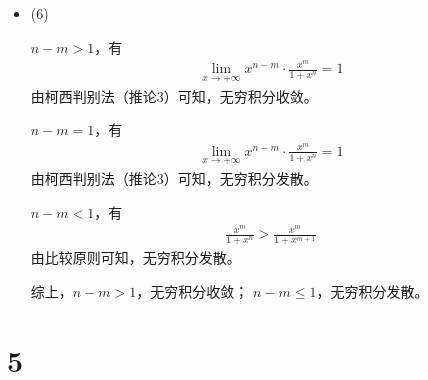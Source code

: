 \documentclass{article}
\begin{document}
\begin{itemize}
        $n > 1$，取$p = \frac{1 + p}{2} > 1$，于是$n - p > 1$
        \begin{align*}
          \lim\limits_{x \to +\infty} x^{p} \cdot \frac{\ln (1 + x)}{x^n}
           & = \lim\limits_{x \to +\infty} \frac{\ln (1 + x)}{x^{n - p}} \\
           & = 0
        \end{align*}
        所以无穷积分收敛。

        $n = 1$，有
        \begin{align*}
          \lim\limits_{x \to +\infty} x \cdot \frac{\ln (1 + x)}{x}
           & = \lim\limits_{x \to +\infty} \ln (1 + x) \\
           & = +\infty
        \end{align*}
        所以无穷积分发散。

        $n < 1$，有
        \begin{align*}
          \frac{\ln (1 + x)}{x^n} > \frac{\ln (1 + x)}{x}
        \end{align*}
        由比较原则，无穷积分发散。

        综上，$n \leq 1$，无穷积分发散；
        $n > 1$，无穷积分收敛。

  \item (6)

        $n - m > 1$，有
        \begin{align*}
          \lim \limits_{x \to +\infty} x^{n - m} \cdot \frac{x^m}{1 + x^n} = 1
        \end{align*}
        由柯西判别法（推论3）可知，无穷积分收敛。

        $n - m = 1$，有
        \begin{align*}
          \lim \limits_{x \to +\infty} x^{n - m} \cdot \frac{x^m}{1 + x^n} = 1
        \end{align*}
        由柯西判别法（推论3）可知，无穷积分发散。

        $n - m < 1$，有
        \begin{align*}
          \frac{x^m}{1 + x^n} > \frac{x^m}{1 + x^{m + 1}}
        \end{align*}
        由比较原则可知，无穷积分发散。

        综上，$n - m > 1$，无穷积分收敛；
        $n - m \leq 1$，无穷积分发散。
\end{itemize}

\section*{5}
\end{document}
